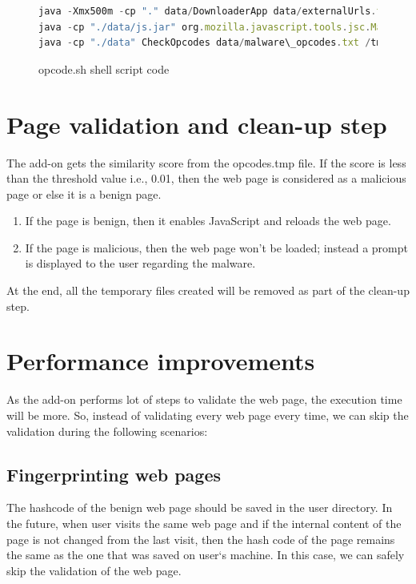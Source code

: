 \begin{figure}[h]
  \centering
\begin{lstlisting}[frame=single,language=JavaScript,mathescape=false]
java -Xmx500m -cp "." data/DownloaderApp data/externalUrls.txt
java -cp "./data/js.jar" org.mozilla.javascript.tools.jsc.Main /tmp/JSStatements.js > /tmp/opcodes.txt
java -cp "./data" CheckOpcodes data/malware\_opcodes.txt /tmp/opcodes.txt > $1
\end{lstlisting}
\caption[opcode.sh shell script code]{opcode.sh shell script code}
    \label{fig:shellscriptcode}
\end{figure}

\section{Page validation and clean-up step}

The add-on gets the similarity score from the opcodes.tmp file. If the score is less than the threshold value i.e., 0.01, then the web page is considered as a malicious page or else it is a benign page. 
\begin{enumerate}
\item If the page is benign, then it enables JavaScript and reloads the web page.
\item If the page is malicious, then the web page won't be loaded; instead a prompt is displayed to the user regarding the malware.
\end{enumerate}
At the end, all the temporary files created will be removed as part of the clean-up step.

\section{Performance improvements} 
As the add-on performs lot of steps to validate the web page, the execution time will be more. So, instead of validating every web page every time, we can skip the validation during the following scenarios: 
\subsection{Fingerprinting web pages}
The hashcode of the benign web page should be saved in the user directory. In the future, when user visits the same web page and if the internal content of the page is not changed from the last visit, then the hash code of the page remains the same as the one that was saved on user`s machine. In this case, we can safely skip the validation of the web page. 

